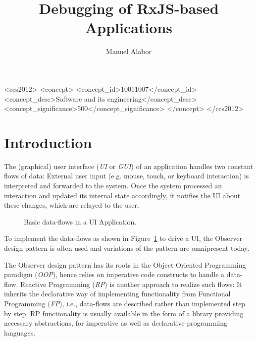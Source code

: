 \documentclass[sigplan,screen,review]{acmart}
\title{Debugging of RxJS-based Applications}
\author{Manuel Alabor}
\affiliation{
	\institution{Eastern Switzerland University of Applied Sciences}
	\city{Rapperswil}
	\country{Switzerland}
}
\begin{document}
\begin{abstract}
	
\end{abstract}

\begin{CCSXML}
	<ccs2012>
	   <concept>
		   <concept_id>10011007</concept_id>
		   <concept_desc>Software and its engineering</concept_desc>
		   <concept_significance>500</concept_significance>
		   </concept>
	 </ccs2012>
\end{CCSXML}



\maketitle

\section{Introduction}

The (graphical) user interface (\emph{UI} or \emph{GUI}) of an application handles two constant flows of data: External user input (e.g. mouse, touch, or keyboard interaction) is interpreted and forwarded to the system. Once the system processed an interaction and updated its internal state accordingly, it notifies the UI about these changes, which are relayed to the user.

\begin{figure}
	\centering
	\caption{Basic data-flows in a UI Application.}
	\label{fig:ui-data-flows}
\end{figure}

To implement the data-flows as shown in Figure~\ref{fig:ui-data-flows} to drive a UI, the Observer design pattern\cite{gamma1995design} is often used and variations of the pattern are omnipresent today\cite{alabor:2019:reactiveappllications}.

The Observer design pattern has its roots in the Object Oriented Programming paradigm (\emph{OOP}), hence relies on imperative code constructs to handle a data-flow. Reactive Programming (\emph{RP}) is another approach to realize such flows: It inherits the declarative way of implementing functionality from Functional Programming (\emph{FP}), i.e., data-flows are described rather than implemented step by step\cite{10.1145/2501654.2501666}. RP functionality is usually available in the form of a library providing necessary abstractions, for imperative as well as declarative programming languages.
\end{document}
